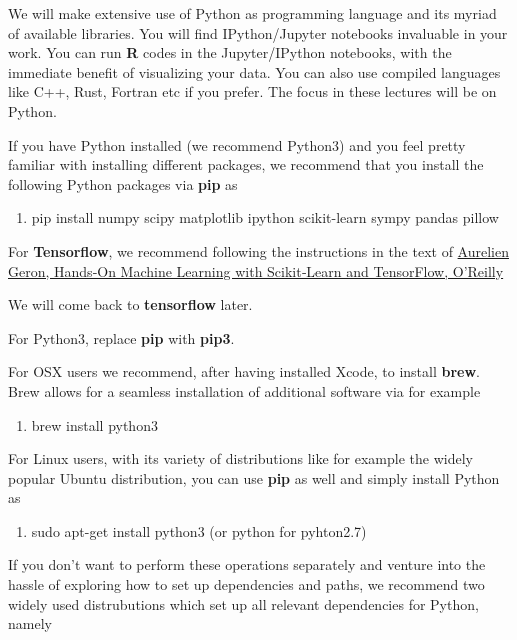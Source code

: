 \documentclass[%
oneside,                 %
final,                   %
10pt]{article}
\begin{document}
\noindent
We will make extensive use of Python as programming language and its
myriad of available libraries.  You will find
IPython/Jupyter notebooks invaluable in your work.  You can run \textbf{R}
codes in the Jupyter/IPython notebooks, with the immediate benefit of
visualizing your data. You can also use compiled languages like C++,
Rust, Fortran etc if you prefer. The focus in these lectures will be
on Python.

If you have Python installed (we recommend Python3) and you feel
pretty familiar with installing different packages, we recommend that
you install the following Python packages via \textbf{pip} as 

\begin{enumerate}
\item pip install numpy scipy matplotlib ipython scikit-learn sympy pandas pillow 
\end{enumerate}

\noindent
For \textbf{Tensorflow}, we recommend following the instructions in the text of 
\href{{http://shop.oreilly.com/product/0636920052289.do}}{Aurelien Geron, Hands‑On Machine Learning with Scikit‑Learn and TensorFlow, O'Reilly}

We will come back to \textbf{tensorflow} later. 

For Python3, replace \textbf{pip} with \textbf{pip3}.

For OSX users we recommend, after having installed Xcode, to
install \textbf{brew}. Brew allows for a seamless installation of additional
software via for example 

\begin{enumerate}
\item brew install python3
\end{enumerate}

\noindent
For Linux users, with its variety of distributions like for example the widely popular Ubuntu distribution,
you can use \textbf{pip} as well and simply install Python as 

\begin{enumerate}
\item sudo apt-get install python3  (or python for pyhton2.7)
\end{enumerate}

\noindent
If you don't want to perform these operations separately and venture
into the hassle of exploring how to set up dependencies and paths, we
recommend two widely used distrubutions which set up all relevant
dependencies for Python, namely 
\end{document}

